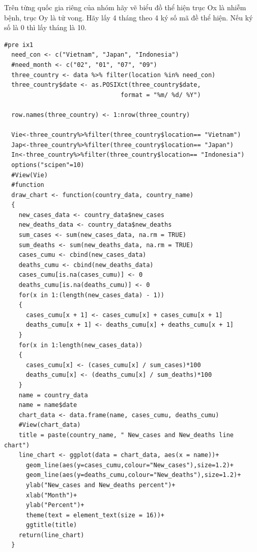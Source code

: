 \documentclass[a4paper]{article}
\theoremstyle{definition}
\begin{document}
\begin{enumerate}[i)]
\begin{enumerate}[1)]
        Trên từng quốc gia riêng của nhóm hãy vẽ biểu đồ thể hiện trục Ox là nhiễm bệnh, trục Oy là tử vong. Hãy lấy 4 tháng theo 4 ký số mã đề thể hiện. Nếu ký số là 0 thì lấy tháng là 10.
        
        \begin{lstlisting}[frame=single]
#pre ix1
  need_con <- c("Vietnam", "Japan", "Indonesia")
  #need_month <- c("02", "01", "07", "09")
  three_country <- data %>% filter(location %in% need_con)
  three_country$date <- as.POSIXct(three_country$date, 
                                format = "%m/ %d/ %Y")
  
  row.names(three_country) <- 1:nrow(three_country)
  
  Vie<-three_country%>%filter(three_country$location== "Vietnam")
  Jap<-three_country%>%filter(three_country$location== "Japan")
  In<-three_country%>%filter(three_country$location== "Indonesia")
  options("scipen"=10)
  #View(Vie)
  #function
  draw_chart <- function(country_data, country_name)
  {
    new_cases_data <- country_data$new_cases
    new_deaths_data <- country_data$new_deaths
    sum_cases <- sum(new_cases_data, na.rm = TRUE)
    sum_deaths <- sum(new_deaths_data, na.rm = TRUE)
    cases_cumu <- cbind(new_cases_data)
    deaths_cumu <- cbind(new_deaths_data)
    cases_cumu[is.na(cases_cumu)] <- 0
    deaths_cumu[is.na(deaths_cumu)] <- 0
    for(x in 1:(length(new_cases_data) - 1))
    {
      cases_cumu[x + 1] <- cases_cumu[x] + cases_cumu[x + 1]
      deaths_cumu[x + 1] <- deaths_cumu[x] + deaths_cumu[x + 1]
    }
    for(x in 1:length(new_cases_data))
    {
      cases_cumu[x] <- (cases_cumu[x] / sum_cases)*100
      deaths_cumu[x] <- (deaths_cumu[x] / sum_deaths)*100
    }
    name = country_data
    name = name$date
    chart_data <- data.frame(name, cases_cumu, deaths_cumu)
    #View(chart_data)
    title = paste(country_name, " New_cases and New_deaths line chart")
    line_chart <- ggplot(data = chart_data, aes(x = name))+
      geom_line(aes(y=cases_cumu,colour="New_cases"),size=1.2)+
      geom_line(aes(y=deaths_cumu,colour="New_deaths"),size=1.2)+
      ylab("New_cases and New_deaths percent")+
      xlab("Month")+
      ylab("Percent")+
      theme(text = element_text(size = 16))+
      ggtitle(title)
    return(line_chart)
  }
  

\end{lstlisting}
\end{enumerate}
\end{enumerate}
\end{document}
